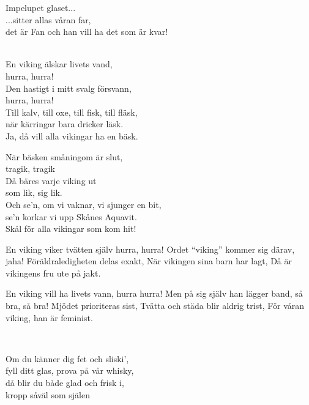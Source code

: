 Impelupet glaset...\\
...sitter allas våran far,\\
det är Fan och han vill ha det som är kvar! \\


 \\       

\songtext{}En viking älskar livets vand,\\
hurra, hurra!\\
Den hastigt i mitt svalg försvann,\\
hurra, hurra!\\
Till kalv, till oxe, till fisk, till fläsk,\\
när kärringar bara dricker läsk.\\
Ja, då vill alla vikingar ha en bäsk.

När bäsken småningom är slut,\\
tragik, tragik\\
Då bäres varje viking ut\\
som lik, sig lik.\\
Och se'n, om vi vaknar, vi sjunger en bit,\\
se'n korkar vi upp Skånes Aquavit.\\
Skål för alla vikingar som kom hit!\\

\newpage

\songtext{}En viking viker tvätten själv
hurra, hurra!
Ordet “viking” kommer sig därav,
jaha!
Föräldraledigheten delas exakt,
När vikingen sina barn har lagt,
Då är vikingens fru ute på jakt.

En viking vill ha livets vann,
hurra hurra!
Men på sig själv han lägger band,
så bra, så bra!
Mjödet prioriteras sist,
Tvätta och städa blir aldrig trist,
För våran viking, han är feminist.




 \\       

\songtext{}
Om du känner dig fet och sliski',\\
fyll ditt glas, prova på vår whisky,\\
då blir du både glad och frisk i, \\
kropp såväl som själen

